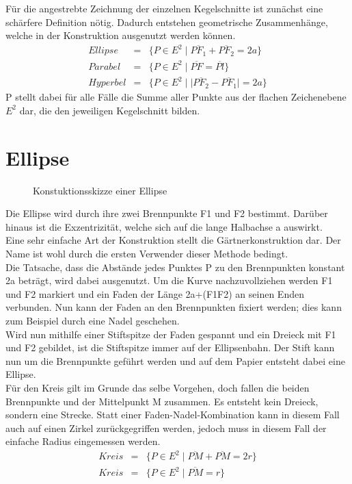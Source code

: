 \setcounter{section}{0}
Für die angestrebte Zeichnung der einzelnen Kegelschnitte ist zunächst eine schärfere Definition nötig. Dadurch entstehen geometrische Zusammenhänge, welche in der Konstruktion ausgenutzt werden können.
\begin{displaymath}
	\begin{array}{rcl}
		Ellipse  & = & \{P\in E^2\;|\;\overline{{PF}_1} + \overline{{PF}_2} = 2a\}\\
		Parabel  & = & \{P\in E^2\;|\;\overline{PF} = \overline{Pl}\}\\
		Hyperbel & = & \{P\in E^2\;|\;|\overline{{PF}_2} - \overline{{PF}_1}| = 2a\}
	\end{array}
\end{displaymath}
P stellt dabei für alle Fälle die Summe aller Punkte aus der flachen Zeichenebene $E^2$ dar, die den jeweiligen Kegelschnitt bilden.
\section{Ellipse}
\begin{figure}[h]
	\centering
		\resizebox{.5\linewidth}{!}{
			
		}
	\caption{Konstuktionsskizze einer Ellipse}
\end{figure}
Die Ellipse wird durch ihre zwei Brennpunkte F1 und F2 bestimmt. Darüber hinaus ist die Exzentrizität, welche sich auf die lange Halbachse a auswirkt.\\
Eine sehr einfache Art der Konstruktion stellt die Gärtnerkonstruktion dar. Der Name ist wohl durch die ersten Verwender dieser Methode bedingt.\\
Die Tatsache, dass die Abstände jedes Punktes P zu den Brennpunkten konstant 2a beträgt, wird dabei ausgenutzt. Um die Kurve nachzuvollziehen werden F1 und F2 markiert und ein Faden der Länge 2a+(F1F2) an seinen Enden verbunden. Nun kann der Faden an den Brennpunkten fixiert werden; dies kann zum Beispiel durch eine Nadel geschehen.\\
Wird nun mithilfe einer Stiftspitze der Faden gespannt und ein Dreieck mit F1 und F2 gebildet, ist die Stiftspitze immer auf der Ellipsenbahn. Der Stift kann nun um die Brennpunkte geführt werden und auf dem Papier entsteht dabei eine Ellipse.\\
Für den Kreis gilt im Grunde das selbe Vorgehen, doch fallen die beiden Brennpunkte und der Mittelpunkt M zusammen. Es entsteht kein Dreieck, sondern eine Strecke. Statt einer Faden-Nadel-Kombination kann in diesem Fall auch auf einen Zirkel zurückgegriffen werden, jedoch muss in diesem Fall der einfache Radius eingemessen werden.
\begin{displaymath}
	\begin{array}{rcl}
		Kreis & = & \{P\in E^2\;|\;\overline{PM} + \overline{PM} = 2r\}\\
		Kreis & = & \{P\in E^2\;|\;\overline{PM} = r\}
	\end{array}
\end{displaymath}
